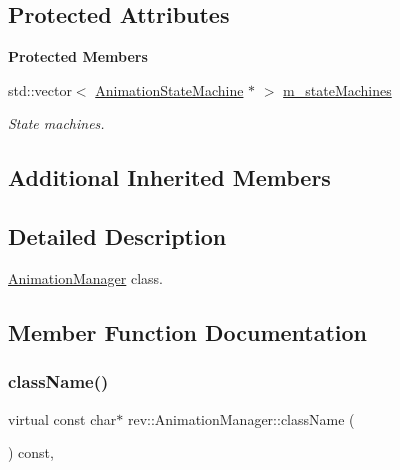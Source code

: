 \subsection*{Protected Attributes}
\begin{Indent}\textbf{ Protected Members}\par
\begin{DoxyCompactItemize}
\item 
\mbox{\label{classrev_1_1_animation_manager_a56cb374407bf7d366cf0571582986e31}} 
std\+::vector$<$ \mbox{\hyperlink{classrev_1_1_animation_state_machine}{Animation\+State\+Machine}} $\ast$ $>$ \mbox{\hyperlink{classrev_1_1_animation_manager_a56cb374407bf7d366cf0571582986e31}{m\+\_\+state\+Machines}}
\begin{DoxyCompactList}\small\item\em State machines. \end{DoxyCompactList}\end{DoxyCompactItemize}
\end{Indent}
\subsection*{Additional Inherited Members}


\subsection{Detailed Description}
\mbox{\hyperlink{classrev_1_1_animation_manager}{Animation\+Manager}} class. 

\subsection{Member Function Documentation}
\mbox{\label{classrev_1_1_animation_manager_a75045d17ce187cc554ff1b2f12e2fea5}} 
\subsubsection{\texorpdfstring{className()}{className()}}
{\footnotesize\ttfamily virtual const char$\ast$ rev\+::\+Animation\+Manager\+::class\+Name (\begin{DoxyParamCaption}{ }\end{DoxyParamCaption}) const\hspace{0.3cm}{\ttfamily [inline]}, {\ttfamily [virtual]}}



